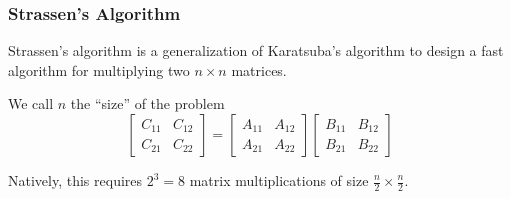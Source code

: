 \subsubsection{Strassen's Algorithm}

Strassen's algorithm is a generalization of Karatsuba's algorithm to design a fast algorithm for multiplying two $n \times n$ matrices.

\begin{listu}
    \item We call $n$ the ``size'' of the problem \[
        \begin{bmatrix}
            C_{11} & C_{12} \\
            C_{21} & C_{22}
        \end{bmatrix} = \begin{bmatrix}
            A_{11} & A_{12} \\
            A_{21} & A_{22}
        \end{bmatrix} \begin{bmatrix}
            B_{11} & B_{12} \\
            B_{21} & B_{22}
        \end{bmatrix}
    \]

    \item Natively, this requires $2^3 = 8$ matrix multiplications of size $\frac{n}{2} \times \frac{n}{2}$.
\end{listu}
